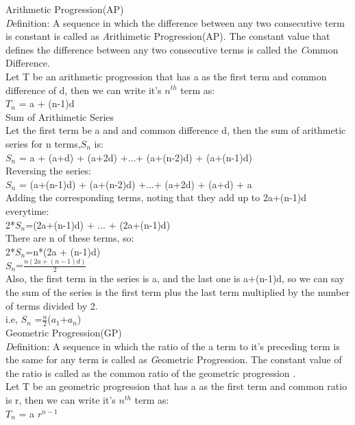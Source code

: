 \documentclass{article}
\begin{document}
 {\Large Arithmetic Progression(AP)}
 \vspace{2mm}
 \\
 {\emph Definition:} \hspace{2mm}A sequence in which the difference between any two consecutive term is constant is called as {\emph Arithimetic Progression(AP)}.
 The constant value that defines the difference between any two consecutive terms is called the {\emph Common Difference}.
 \\ Let T be an arithmetic progression that has a as the first term and common difference of d, then we can write it's $n^{th}$ term as:
 \\$T_{n}$ = a + (n-1)d
\vspace{4mm} \\ 
 {\large Sum of Arithimetic Series}
 \vspace{2mm}
\\Let the first term be a and and common difference d, then the sum of arithmetic series for n terms,$S_{n}$ is:
\\$S_{n}$ = a + (a+d) + (a+2d) +...+ (a+(n-2)d) + (a+(n-1)d) 
\\Reversing the series:
\\$S_{n}$ = (a+(n-1)d) + (a+(n-2)d) +...+ (a+2d) + (a+d) + a
\\Adding the corresponding terms, noting that they add up to 2a+(n-1)d everytime:
\\2*$S_{n}$=(2a+(n-1)d) + ... + (2a+(n-1)d)
\\There are n of these terms, so:
\\ \vspace{0.8mm} 2*$S_{n}$=n*(2a + (n-1)d)
\\ \vspace{0.8mm} $S_{n}$=$\frac{n(2a + (n-1)d)}{2}$
\\Also, the first term in the series is a, and the last one is a+(n-1)d,
so we can say the sum of the series is the first term plus the last term multiplied by the number of terms divided by 2.
\\\vspace{0.8mm}i.e, $S_{n}$ =$\frac{n}{2}$($a_{1}$+$a_{n}$)
\vspace{5mm}
\\
{\Large Geometric Progression(GP)}
 \vspace{2mm}
 \\
 {\emph Definition:} \hspace{2mm} A sequence in which the ratio of the a term to it's preceding term is the same for any term is called as {\emph Geometric Progression}. 
 The constant value of the ratio is called as the common ratio of the geometric progression .
 \\Let T be an geometric progression that has a as the first term and common ratio is r, then we can write it's $n^{th}$ term as:
 \\$T_{n}$ = a $r^{n-1}$
\end{document}
